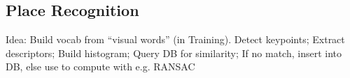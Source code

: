 \subsection{Place Recognition}
Idea: Build vocab from ``visual words'' (in Training).
 Detect keypoints; Extract descriptors; Build histogram; Query DB for similarity; If no match, insert into DB, else use to compute with e.g. RANSAC

